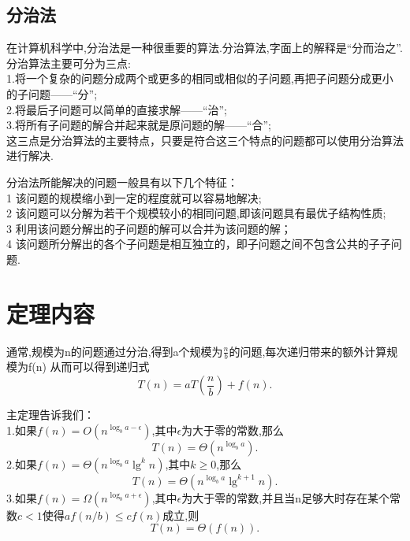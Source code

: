 \documentclass[a4paper]{article}%
\begin{document}
\subsection{分治法}
在计算机科学中,分治法是一种很重要的算法.分治算法,字面上的解释是“分而治之”.分治算法主要可分为三点:\\
1.将一个复杂的问题分成两个或更多的相同或相似的子问题,再把子问题分成更小的子问题——“分”;\\
2.将最后子问题可以简单的直接求解——“治”;\\
3.将所有子问题的解合并起来就是原问题的解——“合”;\\
这三点是分治算法的主要特点，只要是符合这三个特点的问题都可以使用分治算法进行解决.


分治法所能解决的问题一般具有以下几个特征：\\
1 该问题的规模缩小到一定的程度就可以容易地解决;\\
2 该问题可以分解为若干个规模较小的相同问题,即该问题具有最优子结构性质;\\
3 利用该问题分解出的子问题的解可以合并为该问题的解；\\
4 该问题所分解出的各个子问题是相互独立的，即子问题之间不包含公共的子子问题.
\section{定理内容}
通常,规模为n的问题通过分治,得到a个规模为$\frac{n}{b}$的问题,每次递归带来的额外计算规模为f(n)
从而可以得到递归式
\begin{equation*}
T(n)=aT(\frac{n}{b})+f(n). \tag{$\ast$}
\end{equation*}


主定理告诉我们：\\
1.如果$f(n)=O(n^{\log _ba-\epsilon})$,其中$\epsilon$为大于零的常数,那么
\[T(n)=\Theta(n^{\log_ba}).\]
2.如果$f(n)=\Theta(n^{\log _ba}\lg^kn)$,其中$k\ge0$,那么
\[T(n)=\Theta(n^{\log_ba}\lg^{k+1}n).\]
3.如果$f(n)=\Omega(n^{\log _ba+\epsilon})$,其中$\epsilon$为大于零的常数,并且当n足够大时存在某个常数$c<1$使得$af(n/b)\le cf(n)$成立,则
\[T(n)=\Theta(f(n)).\]
\end{document}
